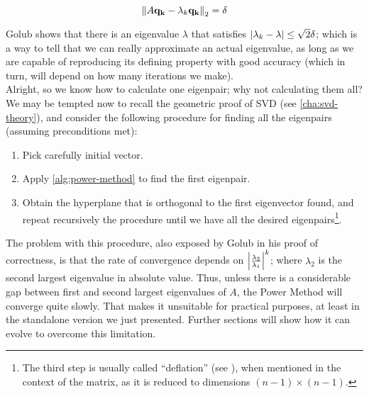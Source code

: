 \[
\left\lVert A \mathbf{q_k} - \lambda_k \mathbf{q_k} \right\rVert_2 = \delta
\]
\hfill

Golub shows that there is an eigenvalue $\lambda$ that satisfies
$\left\lvert \lambda_k - \lambda \right\vert \le \sqrt{2}\delta$; which is a way to tell
that we can really approximate an actual eigenvalue, as long as we are
capable of reproducing its defining property with good accuracy (which
in turn, will depend on how many iterations we make). \\

Alright, so we know how to calculate one eigenpair; why not
calculating them all? We may be tempted now to recall the geometric
proof of SVD (see \cref{cha:svd-theory}), and consider the following
procedure for finding all the eigenpairs (assuming preconditions met):

\begin{enumerate}
\item Pick carefully initial vector. 
\item Apply \cref{alg:power-method} to find the first
  eigenpair. 
\item Obtain the hyperplane that is orthogonal to the first
  eigenvector found, and repeat recursively the procedure until
  we have all the desired eigenpairs\footnote{The third step is
    usually called ``deflation'' (see \cite{golub13}), when mentioned
    in the context of the matrix, as it is reduced to dimensions $(n-1)
    \times (n-1)$.}.
\end{enumerate}
\hfill

The problem with this procedure, also exposed by Golub in his proof of
correctness, is that the rate of convergence depends on
$\left\lvert \frac{\lambda_2}{\lambda_1} \right\vert^k$; where $\lambda_2$ is the second
largest eigenvalue in absolute value. Thus, unless there is a
considerable gap between first and second largest eigenvalues of $A$,
the Power Method will converge quite slowly. That makes it unsuitable
for practical purposes, at least in the standalone version we just
presented. Further sections will show how it can evolve to overcome
this limitation. 
